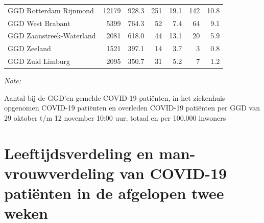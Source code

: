 \documentclass[
  english,
  man,floatsintext]{apa6}
\begin{document}
\begin{table}[H]
\begin{threeparttable}
\begin{tabular}{lrrrrrr}
GGD Rotterdam Rijnmond & 12179 & 928.3 & 251 & 19.1 & 142 & 10.8\\
GGD West Brabant & 5399 & 764.3 & 52 & 7.4 & 64 & 9.1\\
GGD Zaanstreek-Waterland & 2081 & 618.0 & 44 & 13.1 & 20 & 5.9\\
GGD Zeeland & 1521 & 397.1 & 14 & 3.7 & 3 & 0.8\\
GGD Zuid Limburg & 2095 & 350.7 & 31 & 5.2 & 7 & 1.2\\
\bottomrule
\end{tabular}
\begin{tablenotes}
\item \textit{Note: } 
\item Aantal bij de GGD’en gemelde COVID-19 patiënten, in het ziekenhuis opgenomen COVID-19 patiënten en overleden COVID-19 patiënten per GGD van 29 oktober t/m 12 november 10:00 uur, totaal en per 100.000 inwoners
\end{tablenotes}
\end{threeparttable}
\endgroup{}
\end{table}

\newpage

\hypertarget{leeftijdsverdeling-en-man-vrouwverdeling-van-covid-19-patiuxebnten-in-de-afgelopen-twee-weken}{%
\section{Leeftijdsverdeling en man-vrouwverdeling van COVID-19 patiënten in de afgelopen twee weken}\label{leeftijdsverdeling-en-man-vrouwverdeling-van-covid-19-patiuxebnten-in-de-afgelopen-twee-weken}}
\end{document}
